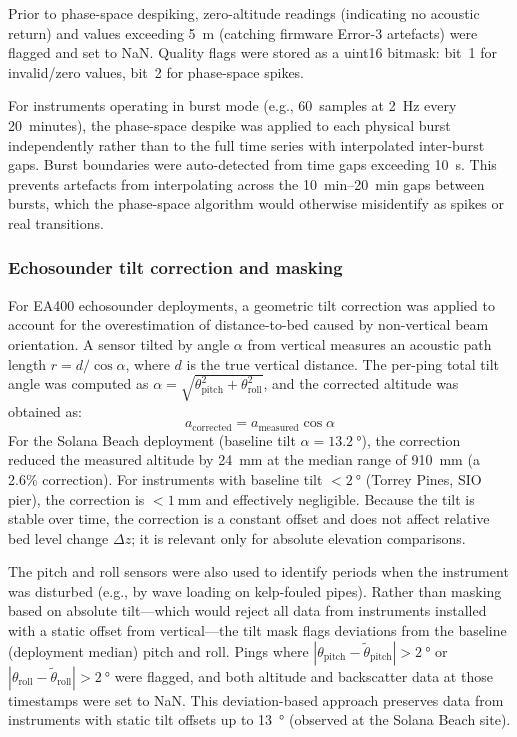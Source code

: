Prior to phase-space despiking, zero-altitude readings (indicating no
acoustic return) and values exceeding \SI{5}{\meter} (catching firmware
Error-3 artefacts) were flagged and set to NaN. Quality flags were
stored as a uint16 bitmask: bit~1 for invalid/zero values, bit~2 for
phase-space spikes.

For instruments operating in burst mode (e.g., 60~samples at
\SI{2}{\hertz} every 20~minutes), the phase-space despike was applied
to each physical burst independently rather than to the full time
series with interpolated inter-burst gaps. Burst boundaries were
auto-detected from time gaps exceeding \SI{10}{\second}. This prevents
artefacts from interpolating across the \SIrange{10}{20}{\minute}
gaps between bursts, which the phase-space algorithm would otherwise
misidentify as spikes or real transitions.

\subsubsection{Echosounder tilt correction and masking}

For EA400 echosounder deployments, a geometric tilt correction was
applied to account for the overestimation of distance-to-bed caused
by non-vertical beam orientation. A sensor tilted by angle $\alpha$
from vertical measures an acoustic path length $r = d / \cos\alpha$,
where $d$ is the true vertical distance. The per-ping total tilt angle
was computed as $\alpha = \sqrt{\theta_\text{pitch}^2 +
\theta_\text{roll}^2}$, and the corrected altitude was obtained as:
%
\begin{equation}
  a_\text{corrected} = a_\text{measured} \cos\alpha
\end{equation}
%
For the Solana Beach deployment (baseline tilt
$\alpha = \SI{13.2}{\degree}$), the correction reduced the measured
altitude by \SI{24}{\milli\meter} at the median range of
\SI{910}{\milli\meter} (a 2.6\% correction). For instruments with
baseline tilt $< \SI{2}{\degree}$ (Torrey Pines, SIO pier), the
correction is $< \SI{1}{\milli\meter}$ and effectively negligible.
Because the tilt is stable over time, the correction is a constant
offset and does not affect relative bed level change $\Delta z$; it
is relevant only for absolute elevation comparisons.

The pitch and roll sensors were also used to identify periods when
the instrument was disturbed (e.g., by wave loading on kelp-fouled
pipes). Rather than masking based on absolute tilt---which would
reject all data from instruments installed with a static offset from
vertical---the tilt mask flags deviations from the baseline
(deployment median) pitch and roll. Pings where
$|\theta_\text{pitch} - \tilde{\theta}_\text{pitch}| > \SI{2}{\degree}$
or
$|\theta_\text{roll} - \tilde{\theta}_\text{roll}| > \SI{2}{\degree}$
were flagged, and both altitude and backscatter data at those
timestamps were set to NaN. This deviation-based approach preserves
data from instruments with static tilt offsets up to
\SI{13}{\degree} (observed at the Solana Beach site).

